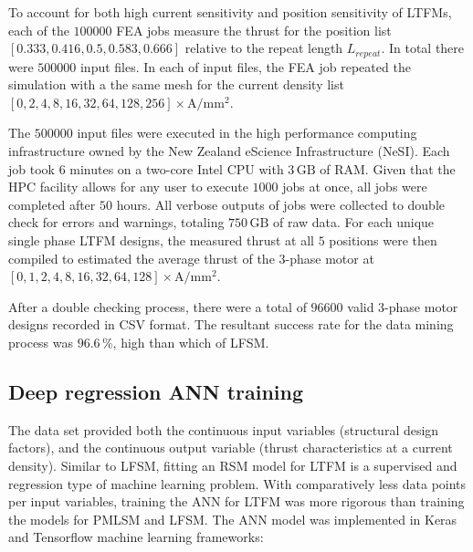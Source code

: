             
            To account for both high current sensitivity and position sensitivity of \acsp{LTFM}, each of the $100000$ \acs{FEA} jobs measure the thrust for the position list $[0.333,0.416,0.5,0.583,0.666]$ relative to the repeat length $L_{repeat}$. In total there were $500000$ input files. In each of input files, the \acs{FEA} job repeated the simulation with a the same mesh for the current density list $[0,2,4,8,16,32,64,128,256]\times\mathrm{A/mm^2}$. 
            
            
            The $500000$ input files were executed in the high performance computing infrastructure owned by the New Zealand eScience Infrastructure (NeSI). Each job took $6$ minutes on a two-core Intel CPU with $3\,\mathrm{GB}$ of RAM. Given that the HPC facility allows for any user to execute $1000$ jobs at once, all jobs were completed after $50$ hours. All verbose outputs of jobs were collected to double check for errors and warnings, totaling $750\,\mathrm{GB}$ of raw data. For each unique single phase \acs{LTFM} designs, the measured thrust at all $5$ positions were then compiled to estimated the average thrust of the 3-phase motor at $[0,1,2,4,8,16,32,64,128]\times\mathrm{A/mm^2}$.
            
            
            After a double checking process, there were a total of $96600$ valid 3-phase motor designs recorded in CSV format. The resultant success rate for the data mining process was $96.6\,\%$, high than which of \acs{LFSM}.
            
            
        \subsection{Deep regression ANN training}   \label{Chapter:RSM/LTFM/ANN training}
        
            
            The data set provided both the continuous input variables (structural design factors), and the continuous output variable (thrust characteristics at a current density). Similar to \acs{LFSM}, fitting an \acs{RSM} model for \acs{LTFM} is a supervised and regression type of machine learning problem. With comparatively less data points per input variables, training the \acs{ANN} for \acs{LTFM} was more rigorous than training the models for \acs{PMLSM} and \acs{LFSM}. The \acs{ANN} model was implemented in Keras and Tensorflow machine learning frameworks:
            
